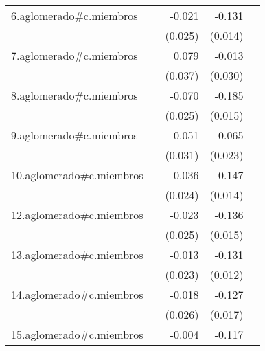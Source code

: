 {\begin{longtable}{l*{4}{D{.}{.}{-1}}}
\addlinespace
6.aglomerado#c.miembros&                     &      -0.021         &      -0.131\sym{***}&                     \\
            &                     &     (0.025)         &     (0.014)         &                     \\
\addlinespace
7.aglomerado#c.miembros&                     &       0.079\sym{*}  &      -0.013         &                     \\
            &                     &     (0.037)         &     (0.030)         &                     \\
\addlinespace
8.aglomerado#c.miembros&                     &      -0.070\sym{**} &      -0.185\sym{***}&                     \\
            &                     &     (0.025)         &     (0.015)         &                     \\
\addlinespace
9.aglomerado#c.miembros&                     &       0.051         &      -0.065\sym{**} &                     \\
            &                     &     (0.031)         &     (0.023)         &                     \\
\addlinespace
10.aglomerado#c.miembros&                     &      -0.036         &      -0.147\sym{***}&                     \\
            &                     &     (0.024)         &     (0.014)         &                     \\
\addlinespace
12.aglomerado#c.miembros&                     &      -0.023         &      -0.136\sym{***}&                     \\
            &                     &     (0.025)         &     (0.015)         &                     \\
\addlinespace
13.aglomerado#c.miembros&                     &      -0.013         &      -0.131\sym{***}&                     \\
            &                     &     (0.023)         &     (0.012)         &                     \\
\addlinespace
14.aglomerado#c.miembros&                     &      -0.018         &      -0.127\sym{***}&                     \\
            &                     &     (0.026)         &     (0.017)         &                     \\
\addlinespace
15.aglomerado#c.miembros&                     &      -0.004         &      -0.117\sym{***}&                     \\

\end{longtable}}
